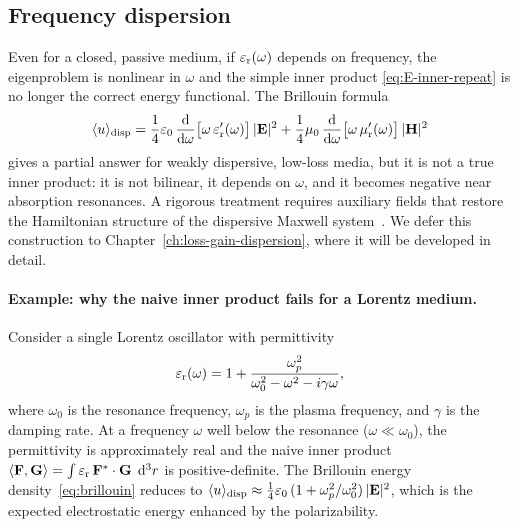 \subsection{Frequency dispersion}
\label{ssec:road-dispersion}

Even for a closed, passive medium, if $\varepsilon_{\mathrm{r}}(\omega)$ depends on frequency,
the eigenproblem is nonlinear in $\omega$ and the simple inner product
\eqref{eq:E-inner-repeat} is no longer the correct energy functional.
The Brillouin formula
\begin{equation}
 \langle u\rangle_{\mathrm{disp}}
 = \frac{1}{4}\varepsilon_0\,
 \frac{\mathop{}\!\mathrm{d} }{\mathop{}\!\mathrm{d} \omega}\bigl[\omega\,\varepsilon_{\mathrm{r}}'(\omega)\bigr]\,|\mathbf{E}|^2
 + \frac{1}{4}\mu_0\,
 \frac{\mathop{}\!\mathrm{d} }{\mathop{}\!\mathrm{d} \omega}\bigl[\omega\,\mu_{\mathrm{r}}'(\omega)\bigr]\,|\mathbf{H}|^2
 \label{eq:brillouin}
\end{equation}
gives a partial answer for weakly dispersive, low-loss media, but it is not
a true inner product: it is not bilinear, it depends on $\omega$, and it
becomes negative near absorption resonances. A rigorous treatment requires
auxiliary fields that restore the Hamiltonian structure of the dispersive
Maxwell system~\cite{figotin2004hamiltonian}. We defer this construction to
Chapter~\ref{ch:loss-gain-dispersion}, where it will be developed in detail.

\paragraph{Example: why the naive inner product fails for a
Lorentz medium.}
Consider a single Lorentz oscillator with permittivity
\begin{equation}
 \varepsilon_{\mathrm{r}}(\omega) = 1 + \frac{\omega_p^2}{\omega_0^2 - \omega^2 - i\gamma\omega},
 \label{eq:lorentz-ch2}
\end{equation}
where $\omega_0$ is the resonance frequency, $\omega_p$ is the plasma
frequency, and $\gamma$ is the damping rate. At a frequency
$\omega$ well below the resonance ($\omega \ll \omega_0$), the
permittivity is approximately real and the naive inner product
$\langle \mathbf{F}, \mathbf{G} \rangle = \int \varepsilon_{\mathrm{r}}\,\mathbf{F}^* \cdot \mathbf{G}\;\mathop{}\!\mathrm{d}^3 r$ is
positive-definite. The Brillouin energy density~\eqref{eq:brillouin}
reduces to $\langle u \rangle_{\mathrm{disp}} \approx
\frac{1}{4}\varepsilon_0\,(1 + \omega_p^2/\omega_0^2)\,|\mathbf{E}|^2$, which is
the expected electrostatic energy enhanced by the polarizability.

